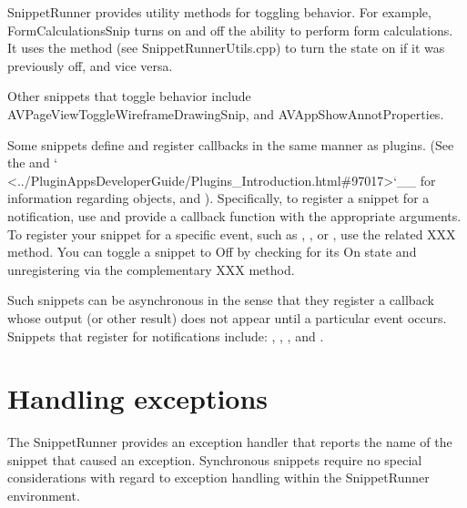 \documentclass[letterpaper,12pt,english,openany,oneside]{sphinxmanual}
\begin{document}
SnippetRunner provides utility methods for toggling behavior. For example, FormCalculationsSnip turns on and off the ability to perform form calculations. It uses the  method (see SnippetRunnerUtils.cpp) to turn the state on if it was previously off, and vice versa.

Other snippets that toggle behavior include AVPageViewToggleWireframeDrawingSnip, and AVAppShowAnnotProperties.

Some snippets define and register callbacks in the same manner as plug\sphinxhyphen{}ins. (See the  and ` <../PluginAppsDeveloperGuide/Plugins\_Introduction.html\#97017>`\_\_ for information regarding  objects,  and  ). Specifically, to register a snippet for a notification, use  and provide a callback function with the appropriate arguments. To register your snippet for a specific event, such as  ,  ,  or  , use the related  XXX method. You can toggle a snippet to Off by checking for its On state and unregistering via the complementary  XXX method.

Such snippets can be asynchronous in the sense that they register a callback whose output (or other result) does not appear until a particular event occurs. Snippets that register for notifications include:  ,  ,  ,  and .


\section{Handling exceptions}
\label{\detokenize{Snippet_WritingSnippets:handling-exceptions}}
The SnippetRunner provides an exception handler that reports the name of the snippet that caused an exception. Synchronous snippets require no special considerations with regard to exception handling within the SnippetRunner environment.
\end{document}
